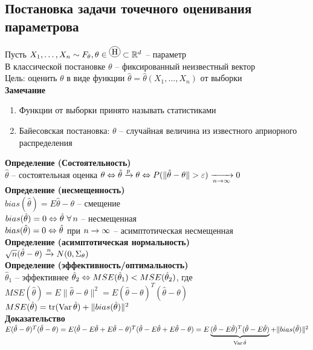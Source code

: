 \documentclass[12pt]{article}
\begin{document}
\subsection{Постановка задачи точечного оценивания параметрова}
Пусть $X_1, \ldots, X_n \sim F_\theta ,\theta \in \encirc H \subset \Rset^d$ -- параметр\\
В классической постановке $\theta$ -- фиксированный неизвестный вектор\\
Цель: оценить $\theta$ в виде функции $\hat \theta = \hat \theta(X_1, \ldots, X_n)$ от выборки\\
\textbf{Замечание}
\begin{enumerate}
	\item Функции от выборки принято называть статистиками
	\item Байесовская постановка: $\theta$ -- случайная величина из известного априорного распределения
\end{enumerate}
\textbf{Определение (Состоятельность)}\\
$\hat \theta$ -- состоятельная оценка $\theta \Leftrightarrow \hat \theta \xrightarrow p \theta \Leftrightarrow P(\| \hat \theta - \theta\| > \varepsilon) \xrightarrow[n \rightarrow \infty]{} 0$\\
\textbf{Определение (несмещенность)}\\
$bias(\hat \theta) = E\hat \theta - \theta$ -- смещение\\
$bias(\hat \theta) = 0 \LRto \hat \theta\ \fall n$ -- несмещенная\\
$bias(\hat \theta) = 0 \Leftrightarrow \hat \theta$ при $n \rightarrow \infty$ -- асимптотическая несмещенная\\
\textbf{Определение (асимптотическая нормальность)}\\
$\sqrt{n}(\hat \theta - \theta) \xrightarrow{n} N(0, \Sigma_\theta)$\\
\textbf{Определение (эффективность/оптимальность)}\\
$\hat \theta_1$ -- эффективнее $\hat \theta_2 \Leftrightarrow MSE(\hat \theta_1) < MSE(\hat \theta_2)$, где $MSE(\hat \theta) = E\|\hat\theta - \theta\|^2 = E(\hat\theta - \theta)^T(\hat\theta - \theta)$\\
$MSE(\hat \theta) = \operatorname{tr}(\operatorname{Var} \hat \theta) + \|bias(\hat \theta)\|^2$\\
\textbf{Доказательство}\\
$E(\hat\theta - \theta)^T(\hat\theta - \theta) = E(\hat\theta - E\hat\theta + E\hat\theta - \theta)^T(\hat\theta - E\hat\theta + E\hat\theta - \theta) = E\underbrace{(\hat \theta - E\hat\theta)^T(\hat \theta - E\hat\theta)}_{\operatorname{Var} \hat \theta}  + \|bias(\hat \theta)\|^2$\\
\end{document}
